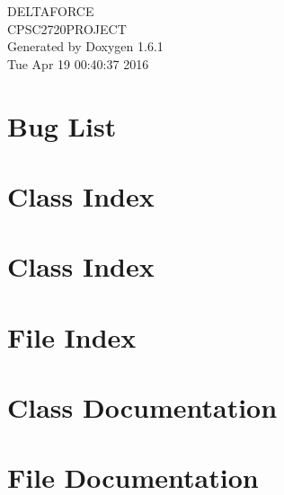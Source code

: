 \documentclass[a4paper]{book}
\begin{document}
\hypersetup{pageanchor=false}
\begin{titlepage}
\vspace*{7cm}
\begin{center}
{\Large DELTAFORCE \\[1ex]\large CPSC2720PROJECT }\\
\vspace*{1cm}
{\large Generated by Doxygen 1.6.1}\\
\vspace*{0.5cm}
{\small Tue Apr 19 00:40:37 2016}\\
\end{center}
\end{titlepage}
\clearemptydoublepage
{}
\tableofcontents
\clearemptydoublepage
{}
\hypersetup{pageanchor=true}
\chapter{Bug List}
\label{bug}
\hypertarget{bug}{}

\chapter{Class Index}

\chapter{Class Index}

\chapter{File Index}

\chapter{Class Documentation}










\chapter{File Documentation}















\printindex
\end{document}
